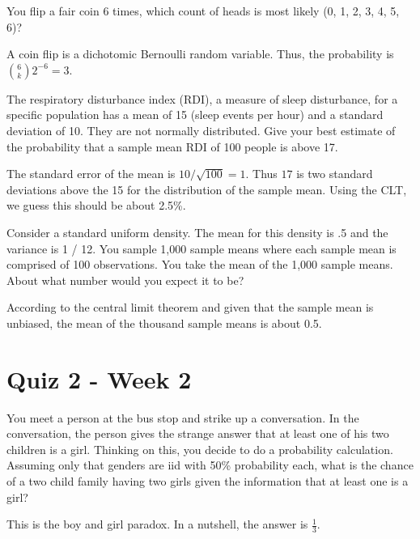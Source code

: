\documentclass{homework}
\begin{document}
\begin{tcolorbox}[title=Question 11]
You flip a fair coin 6 times, which count of heads is most likely (0, 1, 2, 3, 4, 5, 6)?
\end{tcolorbox}

A coin flip is a dichotomic Bernoulli random variable. Thus, the probability is $\binom{6}{k} 2^{-6} = 3$.

\begin{tcolorbox}[title=Question 12]
The respiratory disturbance index (RDI), a measure of sleep disturbance, for a specific population has a mean of 15 (sleep events per hour) and a standard deviation of 10. They are not normally distributed. Give your best estimate of the probability that a sample mean RDI of 100 people is above 17.
\end{tcolorbox}

The standard error of the mean is $10 / \sqrt{100}
= 1$. Thus $17$ is two standard deviations above the 15 for the distribution of the sample mean. Using the CLT, we guess this should be about 2.5\%.

\begin{tcolorbox}[title=Question 13]
Consider a standard uniform density. The mean for this density is .5 and the variance is 1 / 12. You sample 1,000 sample means where each sample mean is comprised of 100 observations. You take the mean of the 1,000 sample means. About what number would you expect it to be?
\end{tcolorbox}

According to the central limit theorem and given that the sample mean is unbiased, the mean of the thousand sample means is about 0.5.

\section{Quiz 2 - Week 2}

\begin{tcolorbox}[title=Question 1]
You meet a person at the bus stop and strike up a conversation. In the conversation, the person gives the strange answer that at least one of his two children is a girl. Thinking on this, you decide to do a probability calculation. Assuming only that genders are iid with 50\% probability each, what is the chance of a two child family having two girls given the information that at least one is a girl?
\end{tcolorbox}

This is the boy and girl paradox. In a nutshell, the answer is $\frac{1}{3}$.
\end{document}
